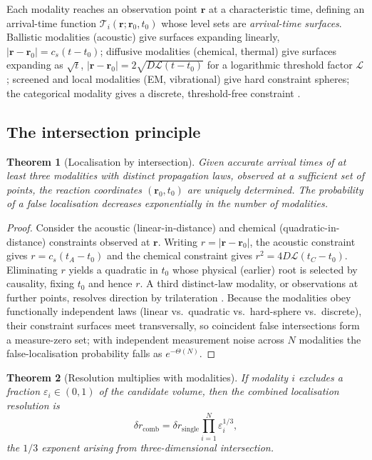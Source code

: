 \documentclass[11pt,twocolumn,a4paper]{article}
\theoremstyle{thmstyle}
\newtheorem{theorem}{Theorem}[section]
\theoremstyle{definition}
\theoremstyle{remark}
\newcommand{\eps}{\varepsilon}
\begin{document}
Each modality reaches an observation point $\mathbf{r}$ at a characteristic
time, defining an arrival-time function
$\mathcal{T}_i(\mathbf{r};\mathbf{r}_0,t_0)$ whose level sets are
\emph{arrival-time surfaces}. Ballistic modalities (acoustic) give surfaces
expanding linearly, $|\mathbf{r}-\mathbf{r}_0|=c_s(t-t_0)$; diffusive
modalities (chemical, thermal) give surfaces expanding as $\sqrt{t}$,
$|\mathbf{r}-\mathbf{r}_0|=2\sqrt{D\mathcal{L}(t-t_0)}$ for a logarithmic
threshold factor $\mathcal{L}$; screened and local modalities (EM,
vibrational) give hard constraint spheres; the categorical modality gives a
discrete, threshold-free constraint
\citep{crank1979mathematics,smoluchowski1917versuch,herzberg1950spectra,%
boxer2009stark}.

\subsection{The intersection principle}

\begin{theorem}[Localisation by intersection]
\label{thm:intersection}
Given accurate arrival times of at least three modalities with distinct
propagation laws, observed at a sufficient set of points, the reaction
coordinates $(\mathbf{r}_0,t_0)$ are uniquely determined. The probability
of a false localisation decreases exponentially in the number of
modalities.
\end{theorem}

\begin{proof}
Consider the acoustic (linear-in-distance) and chemical (quadratic-in-
distance) constraints observed at $\mathbf{r}$. Writing
$r=|\mathbf{r}-\mathbf{r}_0|$, the acoustic constraint gives
$r=c_s(t_A-t_0)$ and the chemical constraint gives
$r^2=4D\mathcal{L}(t_C-t_0)$. Eliminating $r$ yields a quadratic in $t_0$
whose physical (earlier) root is selected by causality, fixing $t_0$ and
hence $r$. A third distinct-law modality, or observations at further
points, resolves direction by trilateration
\citep{fang2008simple}. Because the modalities obey functionally
independent laws (linear vs.\ quadratic vs.\ hard-sphere vs.\ discrete),
their constraint surfaces meet transversally, so coincident false
intersections form a measure-zero set; with independent measurement noise
across $N$ modalities the false-localisation probability falls as
$e^{-\Theta(N)}$.
\end{proof}

\begin{theorem}[Resolution multiplies with modalities]
\label{thm:resolution}
If modality $i$ excludes a fraction $\eps_i\in(0,1)$ of the candidate
volume, then the combined localisation resolution is
\[
\delta r_{\mathrm{comb}}=\delta r_{\mathrm{single}}\prod_{i=1}^{N}
\eps_i^{1/3},
\]
the $1/3$ exponent arising from three-dimensional intersection.
\end{theorem}
\end{document}

